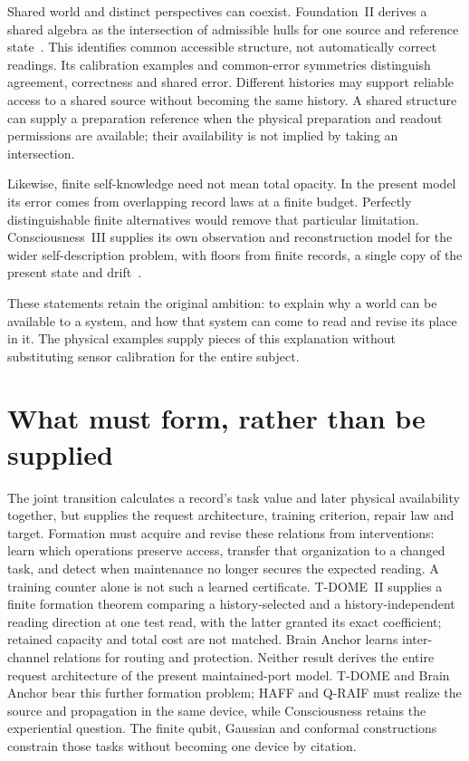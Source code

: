 \documentclass[11pt,a4paper]{article}
\begin{document}
Shared world and distinct perspectives can coexist. Foundation~II
derives a shared algebra as the intersection of admissible hulls for
one source and reference state~\cite{FoundationII}. This identifies
common accessible structure, not automatically correct readings.
Its calibration examples and common-error symmetries distinguish
agreement, correctness and shared error. Different histories may
support reliable access to a shared source without becoming the same
history. A shared structure can supply a preparation reference when
the physical preparation and readout permissions are available;
their availability is not implied by taking an intersection.

Likewise, finite self-knowledge need not mean total opacity. In the
present model its error comes from overlapping record laws at a
finite budget. Perfectly distinguishable finite alternatives would
remove that particular limitation. Consciousness~III supplies its
own observation and reconstruction model for the wider self-description
problem, with floors from finite records, a single copy of the
present state and drift~\cite{PaperIII}.

These statements retain the original ambition: to explain why a world can be available to a system, and how that system can come to read and revise its place in it. The physical examples supply pieces of this explanation without substituting sensor calibration for the entire subject.

\section{What must form, rather than be supplied}

The joint transition calculates a record's task value and later physical availability together, but supplies the request architecture, training criterion, repair law and target. Formation must acquire and revise these relations from interventions: learn which operations preserve access, transfer that organization to a changed task, and detect when maintenance no longer secures the expected reading. A training counter alone is not such a learned certificate. T-DOME~II supplies a finite formation theorem comparing a history-selected and a history-independent reading direction at one test read, with the latter granted its exact coefficient; retained capacity and total cost are not matched. Brain Anchor learns inter-channel relations for routing and protection. Neither result derives the entire request architecture of the present maintained-port model. T-DOME and Brain Anchor bear this further formation problem; HAFF and Q-RAIF must realize the source and propagation in the same device, while Consciousness retains the experiential question. The finite qubit, Gaussian and conformal constructions constrain those tasks without becoming one device by citation.
\end{document}
